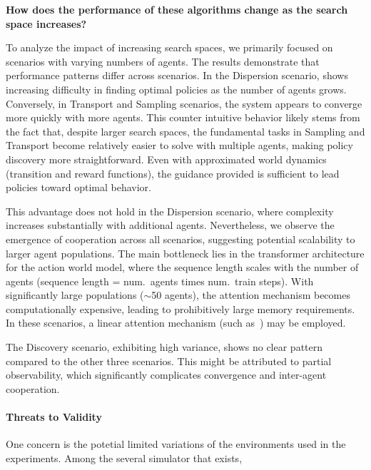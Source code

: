 \begin{center}
 \textbf{How does the performance of these algorithms change as the search space increases?}
\end{center}
To analyze the impact of increasing search spaces, we primarily focused on scenarios with varying numbers of agents. The results demonstrate that performance patterns differ across scenarios. In the Dispersion scenario, \fname{} shows increasing difficulty in finding optimal policies as the number of agents grows. Conversely, in Transport and Sampling scenarios, the system appears to converge more quickly with more agents. This counter intuitive behavior likely stems from the fact that, despite larger search spaces, the fundamental tasks in Sampling and Transport become relatively easier to solve with multiple agents, making policy discovery more straightforward. Even with approximated world dynamics (transition and reward functions), the guidance provided is sufficient to lead policies toward optimal behavior.

This advantage does not hold in the Dispersion scenario, where complexity increases substantially with additional agents. Nevertheless, we observe the emergence of cooperation across all scenarios, suggesting potential scalability to larger agent populations. The main bottleneck lies in the transformer architecture for the action world model, where the sequence length scales with the number of agents (sequence length = num.\ agents times num.\ train steps). With significantly large populations ($\sim$50 agents), the attention mechanism becomes computationally expensive, leading to prohibitively large memory requirements. In these scenarios, a linear attention mechanism (such as~\cite{Beltagy20}) may be employed.

The Discovery scenario, exhibiting high variance, shows no clear pattern compared to the other three scenarios.
This might be attributed to partial observability, which significantly complicates convergence and inter-agent cooperation.

\paragraph{Threats to Validity}
One concern is the potetial limited variations of the environments used in the experiments. 
Among the several simulator that exists, 